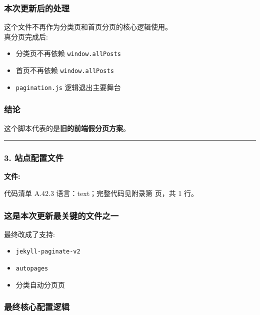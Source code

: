 \documentclass[lang=cn,scheme=chinese,color=blue,device=normal,toc=onecol,math=cm]{elegantbook}
\begin{document}
\subsubsection{本次更新后的处理}


这个文件不再作为分类页和首页分页的核心逻辑使用。\\ 真分页完成后:\par


\begin{itemize}
\item 分类页不再依赖 \texttt{window.allPosts}
\item 首页不再依赖 \texttt{window.allPosts}
\item \texttt{pagination.js} 逻辑退出主要舞台
\end{itemize}


\subsubsection{结论}


这个脚本代表的是\textbf{旧的前端假分页方案}。\par


\medskip\hrule\medskip


\subsubsection{3. 站点配置文件}


\textbf{文件:}\par


\begin{codeindexbox}{代码清单 A.42.3}
语言：text；完整代码见附录第 \pageref{code:42:3} 页，共 1 行。
\end{codeindexbox}


\subsubsection{这是本次更新最关键的文件之一}


最终改成了支持:\par


\begin{itemize}
\item \texttt{jekyll-paginate-v2}
\item \texttt{autopages}
\item 分类自动分页页
\end{itemize}


\subsubsection{最终核心配置逻辑}
\end{document}
